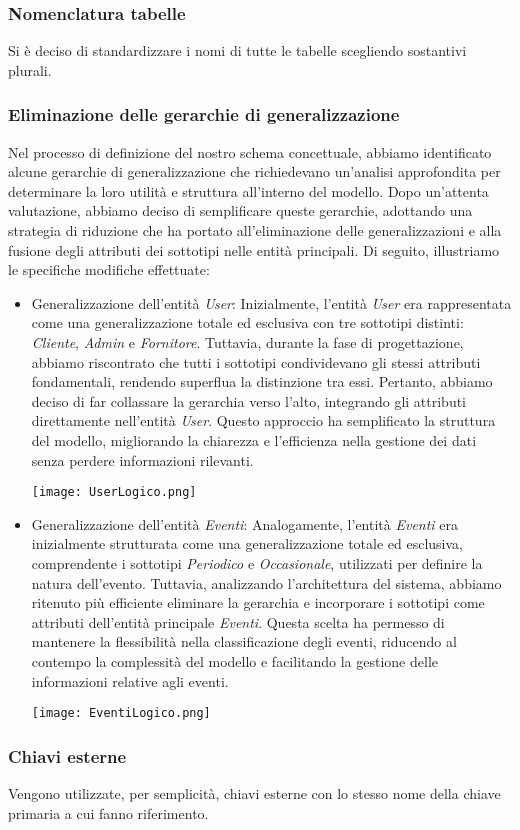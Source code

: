 \subsubsection{Nomenclatura tabelle}
Si è deciso di standardizzare i nomi di tutte le tabelle scegliendo sostantivi plurali.

\subsubsection{Eliminazione delle gerarchie di generalizzazione}
Nel processo di definizione del nostro schema concettuale, abbiamo identificato alcune gerarchie di generalizzazione che richiedevano un'analisi approfondita per determinare la loro utilità e struttura all'interno del modello. Dopo un'attenta valutazione, abbiamo deciso di semplificare queste gerarchie, adottando una strategia di riduzione che ha portato all'eliminazione delle generalizzazioni e alla fusione degli attributi dei sottotipi nelle entità principali. Di seguito, illustriamo le specifiche modifiche effettuate:

\begin{itemize} 
\item 
Generalizzazione dell’entità \textit{User}: Inizialmente, l’entità \textit{User} era rappresentata come una generalizzazione totale ed esclusiva con tre sottotipi distinti: \textit{Cliente}, \textit{Admin} e \textit{Fornitore}. Tuttavia, durante la fase di progettazione, abbiamo riscontrato che tutti i sottotipi condividevano gli stessi attributi fondamentali, rendendo superflua la distinzione tra essi. Pertanto, abbiamo deciso di far collassare la gerarchia verso l’alto, integrando gli attributi direttamente nell’entità \textit{User}. Questo approccio ha semplificato la struttura del modello, migliorando la chiarezza e l'efficienza nella gestione dei dati senza perdere informazioni rilevanti.
\begin{center}
    \texttt{[image: UserLogico.png]}
\end{center}

\item 
Generalizzazione dell’entità \textit{Eventi}: 
Analogamente, l’entità \textit{Eventi} era inizialmente strutturata come una generalizzazione totale ed esclusiva, comprendente i sottotipi \textit{Periodico} e \textit{Occasionale}, utilizzati per definire la natura dell'evento. Tuttavia, analizzando l’architettura del sistema, abbiamo ritenuto più efficiente eliminare la gerarchia e incorporare i sottotipi come attributi dell’entità principale \textit{Eventi}. Questa scelta ha permesso di mantenere la flessibilità nella classificazione degli eventi, riducendo al contempo la complessità del modello e facilitando la gestione delle informazioni relative agli eventi.
\begin{center}
    \texttt{[image: EventiLogico.png]}
\end{center}
\end{itemize}

\subsubsection{Chiavi esterne}
Vengono utilizzate, per semplicità, chiavi esterne con lo stesso nome della chiave primaria a cui fanno riferimento.





